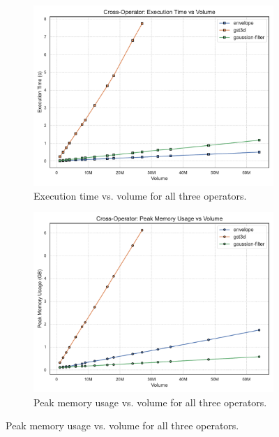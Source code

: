\begin{figure}[htbp]
    \centering
    \begin{subfigure}[t]{0.49\textwidth}
        \centering
        \includegraphics[width=\textwidth]{assets/images/05/cross_execution_time_by_volume}
        \caption{Execution time vs. volume for all three operators.}
    \end{subfigure}
    \hfill
    \begin{subfigure}[t]{0.49\textwidth}
        \centering
        \includegraphics[width=\textwidth]{assets/images/05/cross_peak_memory_by_volume}
        \caption{Peak memory usage vs. volume for all three operators.}
    \end{subfigure}
    \hfill

\end{figure}
